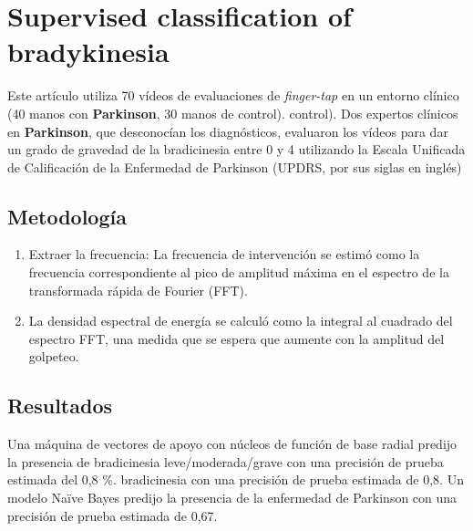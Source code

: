 \section{Supervised classification of bradykinesia}
Este artículo utiliza 70 vídeos de evaluaciones de \textit{finger-tap} en un entorno clínico (40 manos con \textbf{Parkinson}, 30 manos de control).
control). Dos expertos clínicos en \textbf{Parkinson}, que desconocían los diagnósticos, evaluaron los vídeos para dar un grado de gravedad de la bradicinesia entre 0 y 4 utilizando la Escala Unificada de Calificación de la Enfermedad de Parkinson (UPDRS, por sus siglas en inglés)


\subsection{Metodología}
\begin{enumerate}
	\item Extraer la frecuencia: La frecuencia de intervención se estimó como la frecuencia correspondiente al pico de amplitud máxima en el espectro de la transformada rápida de Fourier (FFT). 
	\item La densidad espectral de energía se calculó como la integral al cuadrado del espectro FFT, una medida que se espera que aumente con la amplitud del golpeteo.
\end{enumerate}
\subsection{Resultados}
Una máquina de vectores de apoyo con núcleos de función de base radial predijo la presencia de bradicinesia leve/moderada/grave con una precisión de prueba estimada del 0,8 \%.
bradicinesia con una precisión de prueba estimada de 0,8. Un modelo Naïve Bayes predijo la presencia de la enfermedad de Parkinson con una precisión de prueba estimada de 0,67. 


